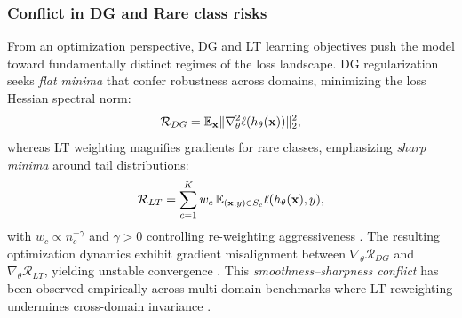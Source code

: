 \documentclass[runningheads]{llncs}
\begin{document}
\subsubsection{Conflict in DG and Rare class risks}

From an optimization perspective, DG and LT learning objectives push the model toward fundamentally distinct regimes of the loss landscape. DG regularization seeks \textit{flat minima} that confer robustness across domains, minimizing the loss Hessian spectral norm:
\begin{equation}
\scriptsize
\mathcal{R}_{DG} = \mathbb{E}_{\mathbf{x}}\|\nabla^2_{\theta}\ell(h_{\theta}(\mathbf{x}))\|_2^2,
\end{equation}
whereas LT weighting magnifies gradients for rare classes, emphasizing \textit{sharp minima} around tail distributions:
\begin{equation}
\scriptsize
\mathcal{R}_{LT} = \sum_{c=1}^K w_c \, \mathbb{E}_{(\mathbf{x},y)\in S_c}\ell(h_{\theta}(\mathbf{x}),y),
\end{equation}
with $w_c \propto n_c^{-\gamma}$ and $\gamma > 0$ controlling re-weighting aggressiveness \cite{Cui19}. The resulting optimization dynamics exhibit gradient misalignment between $\nabla_{\theta}\mathcal{R}_{DG}$ and $\nabla_{\theta}\mathcal{R}_{LT}$, yielding unstable convergence \cite{Su24}. This \textit{smoothness–sharpness conflict} has been observed empirically across multi-domain benchmarks where LT reweighting undermines cross-domain invariance \cite{Yang22,Su24a,Tang25,FRoundation25}.

\end{document}
